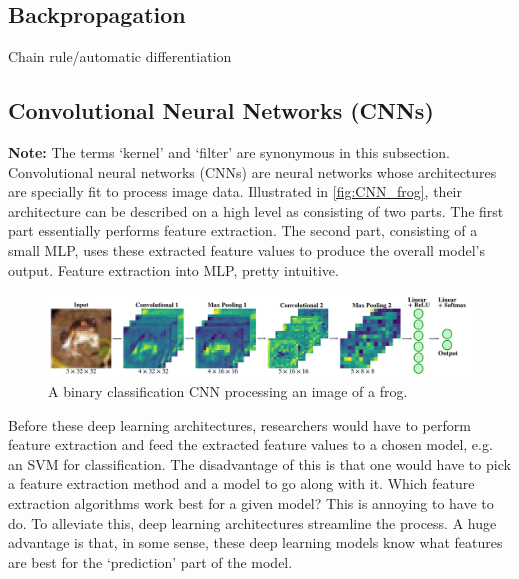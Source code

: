 \documentclass[11pt]{article}
\begin{document}
\subsection{Backpropagation}
\label{subsec:backprop}
Chain rule/automatic differentiation

\subsection{Convolutional Neural Networks (CNNs)}
\label{subsec:conv_neural_networks}

\textbf{Note:} The terms `kernel' and `filter' are synonymous in this subsection.\\

\noindent Convolutional neural networks (CNNs) are neural networks whose architectures are specially fit to process image data. Illustrated in \autoref{fig:CNN_frog}, their architecture can be described on a high level as consisting of two parts. The first part essentially performs feature extraction. The second part, consisting of a small MLP, uses these extracted feature values to produce the overall model's output. Feature extraction into MLP, pretty intuitive.

\begin{figure}[ht]
    \centering
    \includegraphics[width=1\textwidth]{./figures/neural_nets/CNN_frog.pdf}
    \caption{\centering A binary classification CNN processing an image of a frog.}
    \label{fig:CNN_frog}
\end{figure}

\noindent Before these deep learning architectures, researchers would have to perform feature extraction and feed the extracted feature values to a chosen model, e.g. an SVM for classification. The disadvantage of this is that one would have to pick a feature extraction method and a model to go along with it. Which feature extraction algorithms work best for a given model? This is annoying to have to do. To alleviate this, deep learning architectures streamline the process. A huge advantage is that, in some sense, these deep learning models know what features are best for the `prediction' part of the model.
\end{document}
